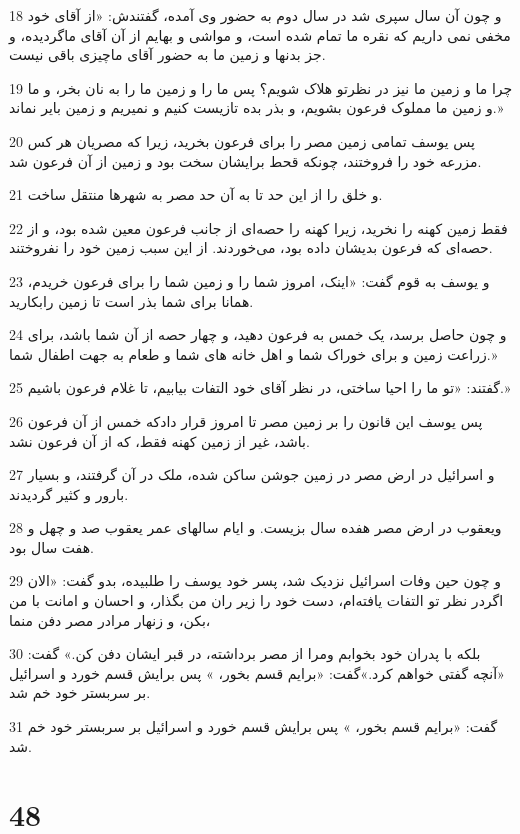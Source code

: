 \par 18 و چون آن سال سپری شد در سال دوم به حضور وی آمده، گفتندش: «از آقای خود مخفی نمی داریم که نقره ما تمام شده است، و مواشی و بهایم از آن آقای ماگردیده، و جز بدنها و زمین ما به حضور آقای ماچیزی باقی نیست.
\par 19 چرا ما و زمین ما نیز در نظرتو هلاک شویم؟ پس ما را و زمین ما را به نان بخر، و ما و زمین ما مملوک فرعون بشویم، و بذر بده تازیست کنیم و نمیریم و زمین بایر نماند.»
\par 20 پس یوسف تمامی زمین مصر را برای فرعون بخرید، زیرا که مصریان هر کس مزرعه خود را فروختند، چونکه قحط برایشان سخت بود و زمین از آن فرعون شد.
\par 21 و خلق را از این حد تا به آن حد مصر به شهرها منتقل ساخت.
\par 22 فقط زمین کهنه را نخرید، زیرا کهنه را حصه‌ای از جانب فرعون معین شده بود، و از حصه‌ای که فرعون بدیشان داده بود، می‌خوردند. از این سبب زمین خود را نفروختند.
\par 23 و یوسف به قوم گفت: «اینک، امروز شما را و زمین شما را برای فرعون خریدم، همانا برای شما بذر است تا زمین رابکارید.
\par 24 و چون حاصل برسد، یک خمس به فرعون دهید، و چهار حصه از آن شما باشد، برای زراعت زمین و برای خوراک شما و اهل خانه های شما و طعام به جهت اطفال شما.»
\par 25 گفتند: «تو ما را احیا ساختی، در نظر آقای خود التفات بیابیم، تا غلام فرعون باشیم.»
\par 26 پس یوسف این قانون را بر زمین مصر تا امروز قرار دادکه خمس از آن فرعون باشد، غیر از زمین کهنه فقط، که از آن فرعون نشد.
\par 27 و اسرائیل در ارض مصر در زمین جوشن ساکن شده، ملک در آن گرفتند، و بسیار بارور و کثیر گردیدند.
\par 28 ویعقوب در ارض مصر هفده سال بزیست. و ایام سالهای عمر یعقوب صد و چهل و هفت سال بود.
\par 29 و چون حین وفات اسرائیل نزدیک شد، پسر خود یوسف را طلبیده، بدو گفت: «الان اگردر نظر تو التفات یافته‌ام، دست خود را زیر ران من بگذار، و احسان و امانت با من بکن، و زنهار مرادر مصر دفن منما،
\par 30 بلکه با پدران خود بخوابم ومرا از مصر برداشته، در قبر ایشان دفن کن.» گفت: «آنچه گفتی خواهم کرد.»گفت: «برایم قسم بخور، » پس برایش قسم خورد و اسرائیل بر سربستر خود خم شد.
\par 31 گفت: «برایم قسم بخور، » پس برایش قسم خورد و اسرائیل بر سربستر خود خم شد.
 
\chapter{48}

